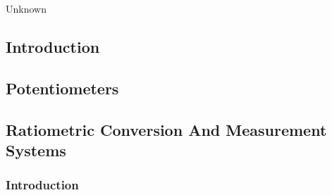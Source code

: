 
\chapter[\csoconeshorttitle{}]{\csoconelongtitle{}}

\label{csoc1}

                     {Unknown}

\section{Introduction}
\label{csoc1:sint0}


\section{Potentiometers}
\label{csoc1:spot0}


\section{Ratiometric Conversion And Measurement Systems}
\label{csoc1:srcs0}



\subsection{Introduction}
\label{csoc1:srcs0:sint0}





